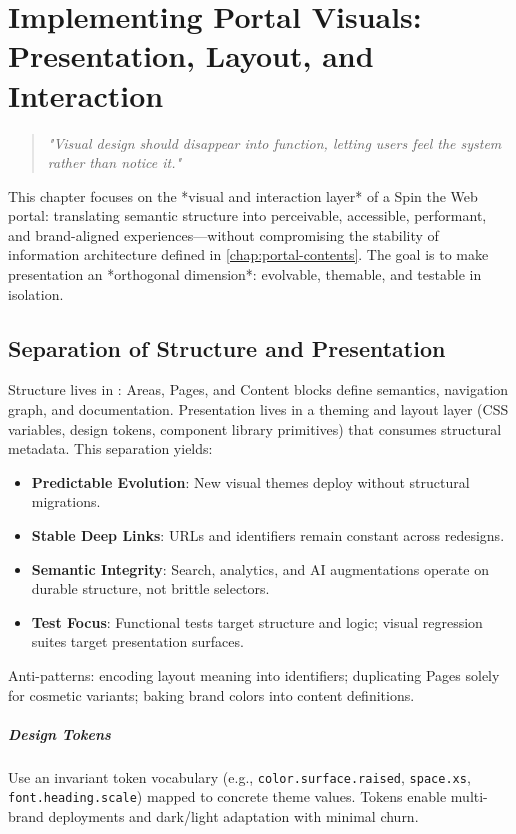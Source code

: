 \chapter{Implementing Portal Visuals: Presentation, Layout, and Interaction}
\label{chap:portal-visuals}

\begin{quote}
\textit{"Visual design should disappear into function, letting users feel the system rather than notice it."}
\end{quote}

This chapter focuses on the *visual and interaction layer* of a Spin the Web portal: translating semantic structure into perceivable, accessible, performant, and brand-aligned experiences—without compromising the stability of information architecture defined in \cref{chap:portal-contents}. The goal is to make presentation an *orthogonal dimension*: evolvable, themable, and testable in isolation.

\section{Separation of Structure and Presentation}
Structure lives in \wbdl{}: Areas, Pages, and Content blocks define semantics, navigation graph, and documentation. Presentation lives in a theming and layout layer (CSS variables, design tokens, component library primitives) that consumes structural metadata. This separation yields:
\begin{itemize}
	\item \textbf{Predictable Evolution}: New visual themes deploy without structural migrations.
	\item \textbf{Stable Deep Links}: URLs and identifiers remain constant across redesigns.
	\item \textbf{Semantic Integrity}: Search, analytics, and AI augmentations operate on durable structure, not brittle selectors.
	\item \textbf{Test Focus}: Functional tests target structure and logic; visual regression suites target presentation surfaces.
\end{itemize}
Anti-patterns: encoding layout meaning into identifiers; duplicating Pages solely for cosmetic variants; baking brand colors into content definitions.

\paragraph{Design Tokens} Use an invariant token vocabulary (e.g., \texttt{color.surface.raised}, \texttt{space.xs}, \texttt{font.heading.scale}) mapped to concrete theme values. Tokens enable multi-brand deployments and dark/light adaptation with minimal churn.

